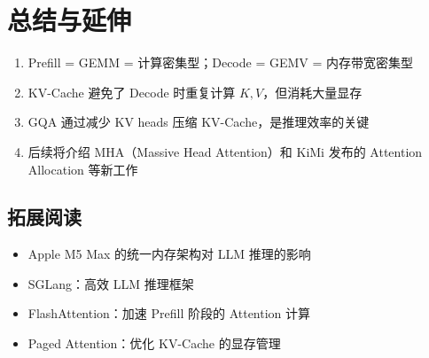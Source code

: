 \section{总结与延伸}

\begin{enumerate}
  \item Prefill = GEMM = 计算密集型；Decode = GEMV = 内存带宽密集型
  \item KV-Cache 避免了 Decode 时重复计算 $K, V$，但消耗大量显存
  \item GQA 通过减少 KV heads 压缩 KV-Cache，是推理效率的关键
  \item 后续将介绍 MHA（Massive Head Attention）和 KiMi 发布的 Attention Allocation 等新工作
\end{enumerate}

\subsection{拓展阅读}
\begin{itemize}
  \item Apple M5 Max 的统一内存架构对 LLM 推理的影响
  \item SGLang：高效 LLM 推理框架
  \item FlashAttention：加速 Prefill 阶段的 Attention 计算
  \item Paged Attention：优化 KV-Cache 的显存管理
\end{itemize}


